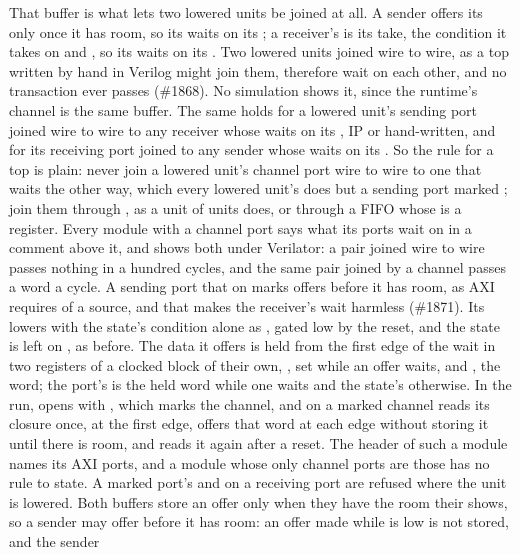 That buffer is what lets two lowered units be joined at all.
A sender offers its  only once it has room, so its
 waits on its ; a receiver's  is
its take, the condition it takes on and , so its
 waits on its .
Two lowered units joined wire to wire, as a top written by hand in
Verilog might join them, therefore wait on each other, and no
transaction ever passes (\#1868).
No simulation shows it, since the runtime's channel is the same buffer.
The same holds for a lowered unit's sending port joined wire to wire
to any receiver whose  waits on its , IP or
hand-written, and for its receiving port joined to any sender whose
 waits on its .
So the rule for a top is plain: never join a lowered unit's channel
port wire to wire to one that waits the other way, which every lowered
unit's does but a sending port marked \code{\#[axi]}; join them through
, as a unit of units does, or through a FIFO whose
 is a register.
Every module with a channel port says what its ports wait on in a
comment above it, and
 shows both under Verilator: a pair joined wire to
wire passes nothing in a hundred cycles, and the same pair joined by a
channel passes a word a cycle.
A sending port that  on  marks offers
before it has room, as AXI requires of a source, and that makes the
receiver's wait harmless (\#1871).
Its  lowers with the state's condition alone as
, gated low by the reset, and the state is left on
, as before.
The data it offers is held from the first edge of the wait in two
registers of a clocked block of their own, ,
set while an offer waits, and , the word; the
port's  is the held word while one waits and the state's
otherwise.
In the run, \code{\#[lower]} opens  with ,
which marks the channel, and  on a marked channel reads
its closure once, at the first edge, offers that word at each edge
without storing it until there is room, and reads it again after a
reset.
The header of such a module names its AXI ports, and a module whose
only channel ports are those has no rule to state.
A marked port's  and \code{\#[axi]} on a receiving port are
refused where the unit is lowered.
Both buffers store an offer only when they have the room their
 shows, so a sender may offer before it has room: an
offer made while  is low is not stored, and the sender
